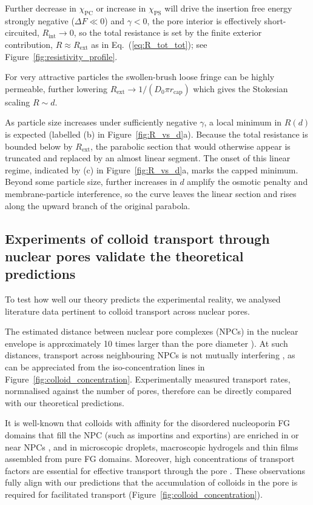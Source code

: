 \documentclass[12pt, a4paper]{article}
\begin{document}
Further decrease in $\chi_{\text{PC}}$ or increase in $\chi_{\text{PS}}$ will drive the insertion free energy strongly negative ($\Delta F \!\ll\! 0$) and $\gamma<0$, the pore interior is effectively short-circuited, $R_{\text{int}} \to 0$, so the total resistance is set by the finite exterior contribution, $R\approx R_{\text{ext}}$ as in Eq.~(\ref{eq:R_tot_tot}); see Figure~\ref{fig:resistivity_profile}.  

For very attractive particles the swollen-brush loose fringe can be highly permeable, further lowering $R_{\text{ext}} \to 1 / (D_0 \pi r_\text{cap})$ which gives the Stokesian scaling  $R \sim d$.

As particle size increases under sufficiently negative $\gamma$, a local minimum in $R(d)$ is expected (labelled \raisebox{0.25em}{\scriptsize$\uparrow$}(b) in Figure~\ref{fig:R_vs_d}a).  
Because the total resistance is bounded below by $R_{\text{ext}}$, the parabolic section that would otherwise appear is truncated and replaced by an almost linear segment.  
The onset of this linear regime, indicated by \raisebox{0.25em}{\scriptsize$\uparrow$}(c) in Figure~\ref{fig:R_vs_d}a, marks the capped minimum.  
Beyond some particle size, further increases in $d$ amplify the osmotic penalty and membrane-particle interference, so the curve leaves the linear section and rises along the upward branch of the original parabola.

\subsection{Experiments of colloid transport through nuclear pores validate the theoretical predictions}

To test how well our theory predicts the experimental reality, we analysed literature data pertinent to colloid transport across nuclear pores.

The estimated distance between nuclear pore complexes (NPCs) in the nuclear envelope is approximately 10 times larger than the pore diameter \cite{Yang2004, Daigle2001, Feldherr1984, Kubitscheck2000}). At such distances, transport across neighbouring NPCs is not mutually interfering \cite{Fabrikant1985}, as can be appreciated from the iso-concentration lines in Figure~\ref{fig:colloid_concentration}. Experimentally measured transport rates, normnalised against the number of pores, therefore can be directly compared with our theoretical predictions.  

It is well-known that colloids with affinity for the disordered nucleoporin FG domains that fill the NPC (such as importins and exportins) are enriched in or near NPCs \cite{Beck2007, Gruenwald2010, Tu2011}, and in microscopic droplets, macroscopic hydrogels and thin films assembled from pure FG domains.
Moreover, high concentrations of transport factors are essential for effective transport through the pore \cite{Lowe2015}.
These observations fully align with our predictions that the accumulation of colloids in the pore is required for facilitated transport (Figure~\ref{fig:colloid_concentration}).
\end{document}
